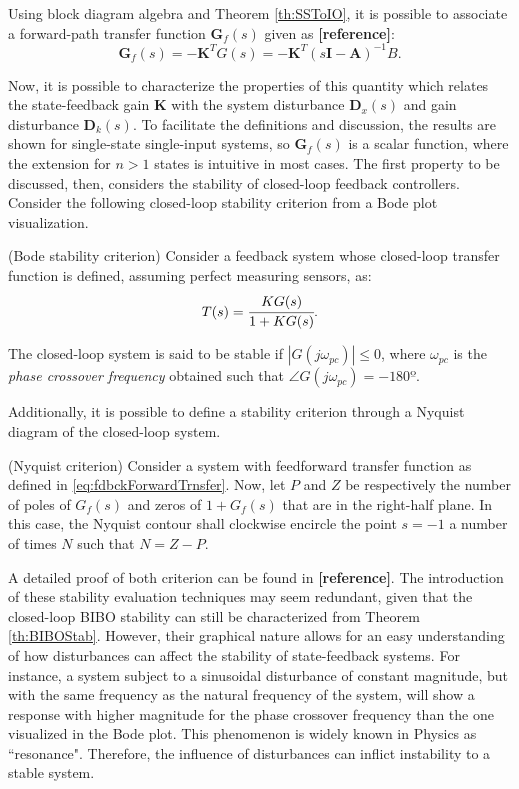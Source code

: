 \documentclass[a4paper,11pt]{book}
\numberwithin{figure}{chapter}
\numberwithin{equation}{chapter}
\numberwithin{table}{chapter}
\newtheorem{theorem}{Theorem}[chapter]
\theoremstyle{definition}
\newcounter{boxed-theorem}
\newenvironment{boxed-theorem}[1]
{\begin{shaded} \begin{theorem}{#1}}
{\end{theorem} \end{shaded}}
\newcounter{boxed-definition}
\begin{document}
Using block diagram algebra and Theorem \ref{th:SSToIO}, it is possible to associate a forward-path transfer function $\bm{G}_{f}(s)$ given as \textbf{[reference]}:
\begin{equation} \label{eq:fdbckForwardTrnsfer}
    \bm{G}_{f}(s) = -\bm{K}^T G(s) =  -\bm{K}^{T} \left(s \bm{I} - \bm{A} \right)^{-1} B 
.\end{equation}

Now, it is possible to characterize the properties of this quantity which relates the state-feedback gain $\bm{K}$ with the system disturbance $\bm{D}_x(s)$ and gain disturbance $\bm{D}_k(s)$. To facilitate the definitions and discussion, the results are shown for single-state single-input systems, so $\bm{G}_f(s)$ is a scalar function, where the extension for $n > 1$ states is intuitive in most cases. The first property to be discussed, then, considers the stability of closed-loop feedback controllers. Consider the following closed-loop stability criterion from a Bode plot visualization.

\begin{boxed-theorem}{(Bode stability criterion)}
    Consider a feedback system whose closed-loop transfer function is defined, assuming perfect measuring sensors, as:
    \begin{equation}
        T(s) = \cfrac{K G(s)}{1 + K G(s)}
    .\end{equation}
    
    The closed-loop system is said to be stable if $| G(j \omega_{pc}) | \leq 0 $, where $\omega_{pc}$ is the \textit{phase crossover frequency} obtained such that $\angle G(j \omega_{pc}) = -180º$.
\end{boxed-theorem}

Additionally, it is possible to define a stability criterion through a Nyquist diagram of the closed-loop system.

\begin{boxed-theorem}{(Nyquist criterion)}
    Consider a system with feedforward transfer function as defined in \eqref{eq:fdbckForwardTrnsfer}. Now, let $P$ and $Z$ be respectively the number of poles of $G_{f}(s)$ and zeros of $1 + G_{f}(s)$ that are in the right-half plane. In this case, the Nyquist contour shall clockwise encircle the point $s = -1$ a number of times $N$ such that $N = Z - P$.
\end{boxed-theorem}

A detailed proof of both criterion can be found in \textbf{[reference]}. The introduction of these stability evaluation techniques may seem redundant, given that the closed-loop BIBO stability can still be characterized from Theorem \ref{th:BIBOStab}. However, their graphical nature allows for an easy understanding of how disturbances can affect the stability of state-feedback systems. For instance, a system subject to a sinusoidal disturbance of constant magnitude, but with the same frequency as the natural frequency of the system, will show a response with higher magnitude for the phase crossover frequency than the one visualized in the Bode plot. This phenomenon is widely known in Physics as ``resonance". Therefore, the influence of disturbances can inflict instability to a stable system.
\end{document}
